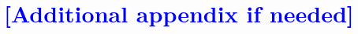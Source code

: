 \documentclass[journal=jctcce,manuscript=article,etalmode=truncate,maxauthors=10,layout=onecolumn]{achemso}
\newcommand{\myblue}[1]{\textcolor{blue}{#1}}
\begin{document}
%
%
\section{\myblue{[Additional appendix if needed]}}
\label{app:additional}


\newpage 


%


\balance
%

%
\balance
\end{document}
